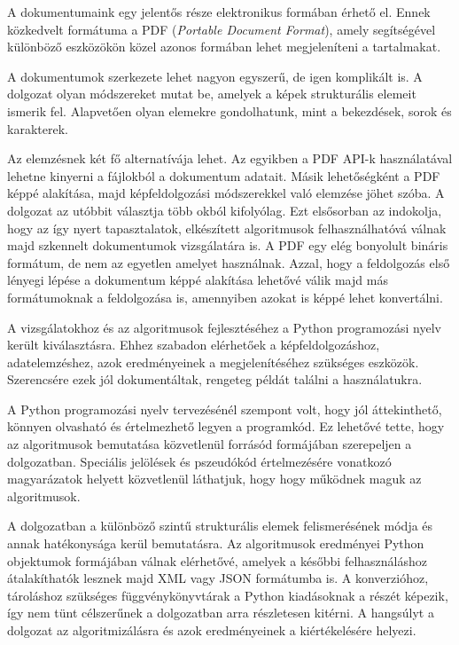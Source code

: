 
A dokumentumaink egy jelentős része elektronikus formában érhető el. Ennek közkedvelt formátuma a PDF (\textit{Portable Document Format}), amely segítségével különböző eszközökön közel azonos formában lehet megjeleníteni a tartalmakat.

A dokumentumok szerkezete lehet nagyon egyszerű, de igen komplikált is. A dolgozat olyan módszereket mutat be, amelyek a képek strukturális elemeit ismerik fel.
Alapvetően olyan elemekre gondolhatunk, mint a bekezdések, sorok és karakterek.

Az elemzésnek két fő alternatívája lehet. Az egyikben a PDF API-k használatával lehetne kinyerni a fájlokból a dokumentum adatait. Másik lehetőségként a PDF képpé alakítása, majd képfeldolgozási módszerekkel való elemzése jöhet szóba. A dolgozat az utóbbit választja több okból kifolyólag. Ezt elsősorban az indokolja, hogy az így nyert tapasztalatok, elkészített algoritmusok felhasználhatóvá válnak majd szkennelt dokumentumok vizsgálatára is. A PDF egy elég bonyolult bináris formátum, de nem az egyetlen amelyet használnak. Azzal, hogy a feldolgozás első lényegi lépése a dokumentum képpé alakítása lehetővé válik majd más formátumoknak a feldolgozása is, amennyiben azokat is képpé lehet konvertálni.

A vizsgálatokhoz és az algoritmusok fejlesztéséhez a Python programozási nyelv került kiválasztásra. Ehhez szabadon elérhetőek a képfeldolgozáshoz, adatelemzéshez, azok eredményeinek a megjelenítéséhez szükséges eszközök. Szerencsére ezek jól dokumentáltak, rengeteg példát találni a használatukra.

A Python programozási nyelv tervezésénél szempont volt, hogy jól áttekinthető, könnyen olvasható és értelmezhető legyen a programkód. Ez lehetővé tette, hogy az algoritmusok bemutatása közvetlenül forrásód formájában szerepeljen a dolgozatban. Speciális jelölések és pszeudókód értelmezésére vonatkozó magyarázatok helyett közvetlenül láthatjuk, hogy hogy működnek maguk az algoritmusok.

A dolgozatban a különböző szintű strukturális elemek felismerésének módja és annak hatékonysága kerül bemutatásra. Az algoritmusok eredményei Python objektumok formájában válnak elérhetővé, amelyek a későbbi felhasználáshoz átalakíthatók lesznek majd XML vagy JSON formátumba is. A konverzióhoz, tároláshoz szükséges függvénykönyvtárak a Python kiadásoknak a részét képezik, így nem tünt célszerűnek a dolgozatban arra részletesen kitérni. A hangsúlyt a dolgozat az algoritmizálásra és azok eredményeinek a kiértékelésére helyezi.

